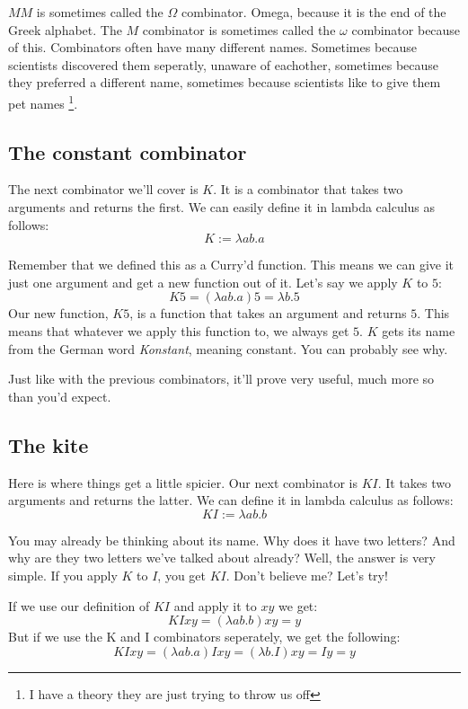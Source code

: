 \documentclass[11pt]{book}
\begin{document}
\(M M\) is sometimes called the \(\Omega\) combinator. Omega, because it is the
end of the Greek alphabet. The \(M\) combinator is sometimes called the
\(\omega\) combinator because of this. Combinators often have many different
names. Sometimes because scientists discovered them seperatly, unaware of
eachother, sometimes because they preferred a different name, sometimes because
scientists like to give them pet names \footnote{I have a theory they are just
trying to throw us off}.

\subsection{The constant combinator}

The next combinator we'll cover is \(K\). It is a combinator that takes two
arguments and returns the first. We can easily define it in lambda calculus as
follows:
\[K:=\lambda ab.a\]

Remember that we defined this as a Curry'd function. This means we can give it
just one argument and get a new function out of it. Let's say we apply \(K\) to
\(5\):
\[K5=(\lambda ab.a)5=\lambda b.5\]
Our new function, \(K5\), is a function that takes an argument and returns
\(5\). This means that whatever we apply this function to, we always get \(5\).
\(K\) gets its name from the German word \emph{Konstant}, meaning constant. You
can probably see why.

Just like with the previous combinators, it'll prove very useful, much more so
than you'd expect.

\subsection{The kite}

Here is where things get a little spicier. Our next combinator is \(KI\). It
takes two arguments and returns the latter. We can define it in lambda calculus
as follows:
\[KI:=\lambda ab.b\]

You may already be thinking about its name. Why does it have two letters? And
why are they two letters we've talked about already? Well, the answer is very
simple. If you apply \(K\) to \(I\), you get \(KI\). Don't believe me? Let's
try!

If we use our definition of \(KI\) and apply it to \(xy\) we get:
\[KIxy=(\lambda ab.b)xy=y\]
But if we use the K and I combinators seperately, we get the following:
\[KIxy=(\lambda ab.a)Ixy=(\lambda b.I)xy=Iy=y\]
\end{document}
